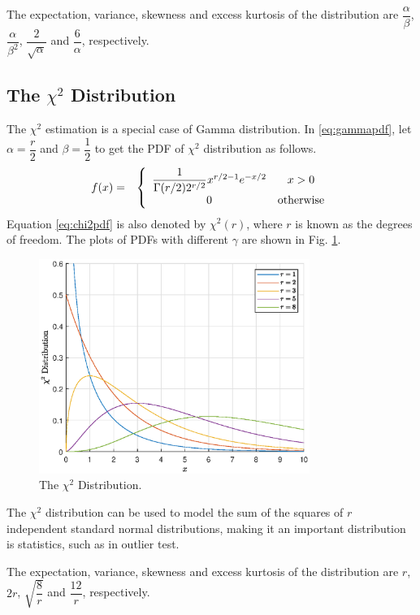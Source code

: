 The expectation, variance, skewness and excess kurtosis of the distribution are $\dfrac{\alpha}{\beta}$, $\dfrac{\alpha}{\beta^2}$, $\dfrac{2}{\sqrt{\alpha}}$ and $\dfrac{6}{\alpha}$, respectively.

\subsection{The $\chi^2$ Distribution}

The $\chi^2$ estimation is a special case of Gamma distribution. In \eqref{eq:gammapdf}, let $\alpha = \dfrac{r}{2}$ and $\beta=\dfrac{1}{2}$ to get the PDF of $\chi^2$ distribution as follows.
\begin{eqnarray}
  f(x) &=& \left\{\begin{array}{cc}
                    \dfrac{1}{\Gamma(r/2)2^{r/2}}x^{r/2-1}e^{-x/2} & x > 0  \\
                    0 & \textup{otherwise}
                  \end{array}\right. \label{eq:chi2pdf}
\end{eqnarray}
Equation \eqref{eq:chi2pdf} is also denoted by $\chi^2(r)$, where $r$ is known as the degrees of freedom. The plots of PDFs with different $\gamma$ are shown in Fig. \ref{fig:chi2_pdf}.
\begin{figure}
	\centering
	\includegraphics[width=250pt]{chapters/ch-commonly-seen-distributions/figs/chi2_pdf.eps}
	\caption{The $\chi^2$ Distribution.} \label{fig:chi2_pdf}
\end{figure}

The $\chi^2$ distribution can be used to model the sum of the squares of $r$ independent standard normal distributions, making it an important distribution is statistics, such as in outlier test. 

The expectation, variance, skewness and excess kurtosis of the distribution are $r$, $2r$, $\sqrt{\dfrac{8}{r}}$ and $\dfrac{12}{r}$, respectively.

